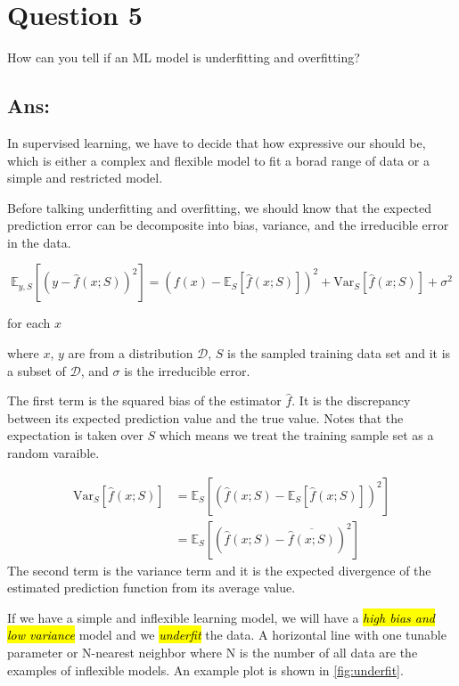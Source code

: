 \documentclass{kthreport}
\begin{document}
\section{Question 5}
How can you tell if an ML model is underfitting and overfitting?
\subsection*{Ans:}

In supervised learning, we have to decide that how expressive our should be,
which is either a complex and flexible model to fit a borad range of data or
a simple and restricted model.

Before talking underfitting and overfitting, we should know that the expected prediction
error can be decomposite into bias, variance, and the irreducible error in the data.

\begin{equation}
    \mathbb{E}_{y,S}[(y-\hat{f}(x; S))^2] =
    (f(x) - \mathbb{E}_{S}[\hat{f}(x; S)])^2
    + \mathrm{Var}_{S}[\hat{f}(x; S)]
    + \sigma^2
\end{equation}

for each $x$

where $x$, $y$ are from a distribution $\mathcal{D}$, $S$ is the sampled training
data set and it is a subset of $\mathcal{D}$, and $\sigma$ is the irreducible error.

The first term is the squared bias of the estimator $\hat{f}$.
It is the discrepancy between its expected prediction value and the true value.
Notes that the expectation is taken over $S$ which means we treat the training sample
set as a random varaible.

\begin{align}
    \mathrm{Var}_{S}[\hat{f}(x; S)]
    &= \mathbb{E}_{S}[(\hat{f}(x; S) - \mathbb{E}_{S}[\hat{f}(x; S)])^2] \\
    &= \mathbb{E}_{S}[(\hat{f}(x; S) - \overline{\hat{f}(x; S)})^2]
\end{align}
The second term is the variance term and it is
the expected divergence of the estimated prediction function from its average value.


If we have a simple and inflexible learning model, we will have
a \emph{\hl{high bias and low variance}} model and we \emph{\hl{underfit}} the data.
A horizontal line with one tunable parameter or N-nearest neighbor
where N is the number of all data are the examples of inflexible models.
An example plot is shown in \cref{fig:underfit}.
\end{document}
